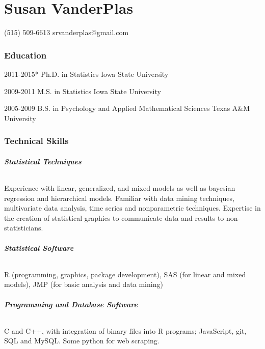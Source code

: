 \documentclass[10pt]{tccv}
\begin{document}
\part{Susan VanderPlas}


    {(515) 509-6613}
    {srvanderplas@gmail.com}
\section{Education}

\begin{yearlist}

\item{2011-2015*}
     {Ph.D. in Statistics}
     {Iowa State University}

\item{2009-2011}
     {M.S. in Statistics}
     {Iowa State University}

\item{2005-2009}
     {B.S. in Psychology and Applied Mathematical Sciences}
     {Texas A\&M University}

\end{yearlist}

\section{Technical Skills}
\paragraph{\textbf{Statistical Techniques}}
Experience with linear, generalized, and mixed models as well as bayesian regression and hierarchical models. Familiar with data mining techniques, multivariate data analysis, time series and nonparametric techniques. Expertise in the creation of statistical graphics to communicate data and results to non-statisticians.\vspace{-6pt}
\paragraph{\textbf{Statistical Software}}
R (programming, graphics, package development), SAS (for linear and mixed models), JMP (for basic analysis and data mining)\vspace{-6pt}
\paragraph{\textbf{Programming and Database Software}}
C and C++, with integration of binary files into R programs; JavaScript, git, SQL and MySQL. Some python for web scraping. \vspace{-6pt}
\end{document}
